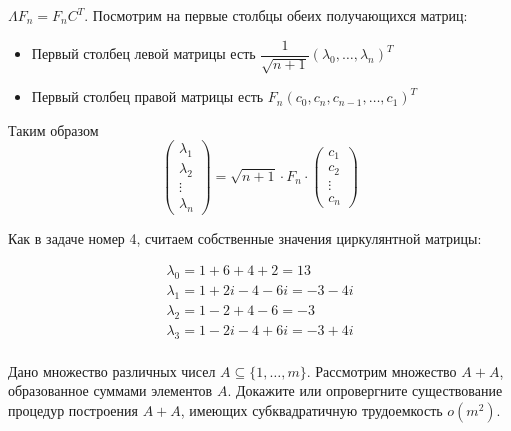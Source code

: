 \documentclass[a4paper,12pt]{article}
\begin{document}
\begin{solution}
	$\Lambda F_n = F_n C^T$. Посмотрим на первые столбцы обеих получающихся матриц:
	\begin{itemize}
		\item Первый столбец левой матрицы есть $\dfrac{1}{\sqrt{n+1}}(\lambda_0, \ldots, \lambda_n)^T$
		\item Первый столбец правой матрицы есть $F_n(c_0, c_n, c_{n-1}, \ldots, c_1)^T$
	\end{itemize}
	
	Таким образом \begin{equation*}
	\left(
	\begin{array}{c}
	\lambda_1 \\
	\lambda_2 \\
	\vdots \\
	\lambda_n
	\end{array}
	\right) = \sqrt{n+1} \cdot F_n \cdot \left(
	\begin{array}{c}
	c_1 \\
	c_2 \\
	\vdots \\
	c_n
	\end{array}
	\right)
	\end{equation*}
	
	Как в задаче номер 4, считаем собственные значения циркулянтной матрицы:
	
\begin{gather*}
\lambda_0 = 1 + 6 + 4 + 2 =13\\
\lambda_1=1+2i-4-6i=-3-4i\\
\lambda_2=1-2+4-6=-3\\
\lambda_3=1-2i-4+6i=-3+4i\\
\end{gather*}
	
\end{solution}

\begin{task}
	Дано множество различных чисел $A\subseteq \{1,\dots,m\}$. Рассмотрим множество $A+A$, образованное суммами элементов $A$. 
	Докажите или опровергните существование процедур построения
	$A+A$, имеющих субквадратичную трудоемкость $o(m^2)$.
\end{task}
\end{document}
